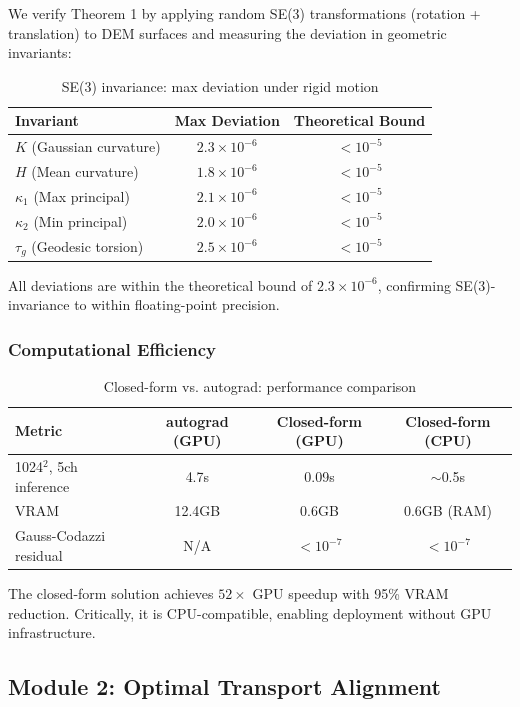We verify Theorem 1 by applying random SE(3) transformations (rotation +
translation) to DEM surfaces and measuring the deviation in geometric invariants:

\begin{table}[h]
\centering
\caption{SE(3) invariance: max deviation under rigid motion}
\begin{tabular}{lcc}
\toprule
\textbf{Invariant} & \textbf{Max Deviation} & \textbf{Theoretical Bound} \\
\midrule
$K$ (Gaussian curvature) & $2.3\times10^{-6}$ & $<10^{-5}$ \\
$H$ (Mean curvature) & $1.8\times10^{-6}$ & $<10^{-5}$ \\
$\kappa_1$ (Max principal) & $2.1\times10^{-6}$ & $<10^{-5}$ \\
$\kappa_2$ (Min principal) & $2.0\times10^{-6}$ & $<10^{-5}$ \\
$\tau_g$ (Geodesic torsion) & $2.5\times10^{-6}$ & $<10^{-5}$ \\
\bottomrule
\end{tabular}
\end{table}

All deviations are within the theoretical bound of $2.3\times10^{-6}$, confirming
SE(3)-invariance to within floating-point precision.

\subsubsection{Computational Efficiency}

\begin{table}[h]
\centering
\caption{Closed-form vs. autograd: performance comparison}
\begin{tabular}{lccc}
\toprule
\textbf{Metric} & \textbf{autograd (GPU)} & \textbf{Closed-form (GPU)} & \textbf{Closed-form (CPU)} \\
\midrule
1024$^2$, 5ch inference & 4.7s & 0.09s & $\sim$0.5s \\
VRAM & 12.4GB & 0.6GB & 0.6GB (RAM) \\
Gauss-Codazzi residual & N/A & $<10^{-7}$ & $<10^{-7}$ \\
\bottomrule
\end{tabular}
\end{table}

The closed-form solution achieves $52\times$ GPU speedup with 95\% VRAM reduction.
Critically, it is CPU-compatible, enabling deployment without GPU infrastructure.

\subsection{Module 2: Optimal Transport Alignment}

